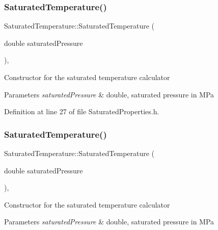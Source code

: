 \subsubsection{\texorpdfstring{Saturated\+Temperature()}{SaturatedTemperature()}\hspace{0.1cm}{\footnotesize\ttfamily [1/3]}}
{\footnotesize\ttfamily Saturated\+Temperature\+::\+Saturated\+Temperature (\begin{DoxyParamCaption}\item[{double}]{saturated\+Pressure }\end{DoxyParamCaption})\hspace{0.3cm}{\ttfamily [inline]}, {\ttfamily [explicit]}}

Constructor for the saturated temperature calculator 
\begin{DoxyParams}{Parameters}
{\em saturated\+Pressure} & double, saturated pressure in M\+Pa \\
\hline
\end{DoxyParams}


Definition at line 27 of file Saturated\+Properties.\+h.

\mbox{\label{class_saturated_temperature_ae0a4b1684a756ac8f91d3ebb646d6865}} 
\subsubsection{\texorpdfstring{Saturated\+Temperature()}{SaturatedTemperature()}\hspace{0.1cm}{\footnotesize\ttfamily [2/3]}}
{\footnotesize\ttfamily Saturated\+Temperature\+::\+Saturated\+Temperature (\begin{DoxyParamCaption}\item[{double}]{saturated\+Pressure }\end{DoxyParamCaption})\hspace{0.3cm}{\ttfamily [inline]}, {\ttfamily [explicit]}}

Constructor for the saturated temperature calculator 
\begin{DoxyParams}{Parameters}
{\em saturated\+Pressure} & double, saturated pressure in M\+Pa \\
\hline
\end{DoxyParams}


